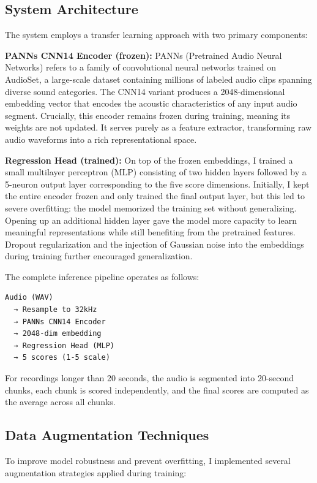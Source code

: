 \documentclass[10pt, a4paper, twocolumn]{article}
\begin{document}
\subsection*{System Architecture}

The system employs a transfer learning approach with two primary components:

\textbf{PANNs CNN14 Encoder (frozen):} PANNs (Pretrained Audio Neural Networks) refers to a family of convolutional neural networks trained on AudioSet, a large-scale dataset containing millions of labeled audio clips spanning diverse sound categories. The CNN14 variant produces a 2048-dimensional embedding vector that encodes the acoustic characteristics of any input audio segment. Crucially, this encoder remains frozen during training, meaning its weights are not updated. It serves purely as a feature extractor, transforming raw audio waveforms into a rich representational space.

\textbf{Regression Head (trained):} On top of the frozen embeddings, I trained a small multilayer perceptron (MLP) consisting of two hidden layers followed by a 5-neuron output layer corresponding to the five score dimensions. Initially, I kept the entire encoder frozen and only trained the final output layer, but this led to severe overfitting: the model memorized the training set without generalizing. Opening up an additional hidden layer gave the model more capacity to learn meaningful representations while still benefiting from the pretrained features. Dropout regularization and the injection of Gaussian noise into the embeddings during training further encouraged generalization.

The complete inference pipeline operates as follows:
\begin{verbatim}
Audio (WAV) 
  → Resample to 32kHz
  → PANNs CNN14 Encoder
  → 2048-dim embedding
  → Regression Head (MLP)
  → 5 scores (1-5 scale)
\end{verbatim}

For recordings longer than 20 seconds, the audio is segmented into 20-second chunks, each chunk is scored independently, and the final scores are computed as the average across all chunks.

\subsection*{Data Augmentation Techniques}

To improve model robustness and prevent overfitting, I implemented several augmentation strategies applied during training:
\end{document}
